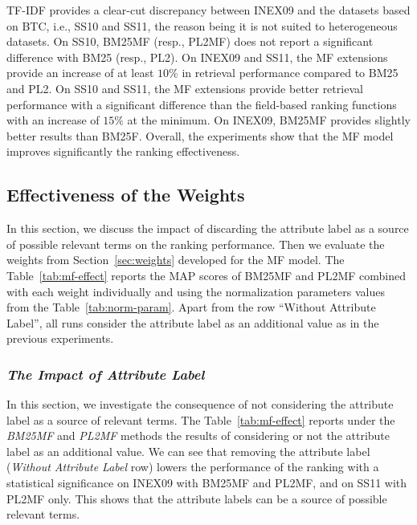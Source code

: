 TF-IDF provides a clear-cut discrepancy between INEX09 and the datasets based on BTC, i.e., SS10 and SS11, the reason being it is not suited to heterogeneous datasets.
On SS10, BM25MF (resp., PL2MF) does not report a significant difference with BM25 (resp., PL2). On INEX09 and SS11, the MF extensions provide an increase of at least $10\%$ in retrieval performance compared to BM25 and PL2. On SS10 and SS11, the MF extensions provide better retrieval performance with a significant difference than the field-based ranking functions with an increase of $15\%$ at the minimum. On INEX09, BM25MF provides slightly better results than BM25F. Overall, the experiments show that the MF model improves significantly the ranking effectiveness.



\subsection{Effectiveness of the Weights}
\label{sec:weights-effectiveness}

In this section, we discuss the impact of discarding the attribute label as a source of possible relevant terms on the ranking performance. Then we evaluate the weights from Section~\ref{sec:weights} developed for the MF model.
The Table~\ref{tab:mf-effect} reports the MAP scores of BM25MF and PL2MF combined with each weight individually and using the normalization parameters values from the Table~\ref{tab:norm-param}. Apart from the row ``Without Attribute Label'', all runs consider the attribute label as an additional value as in the previous experiments.

\subsubsection{\emph{The Impact of Attribute Label}}
\label{sec:with-att}

In this section, we investigate the consequence of not considering the attribute label as a source of relevant terms.
The Table~\ref{tab:mf-effect} reports under the \emph{BM25MF} and \emph{PL2MF} methods the results of considering or not the attribute label as an additional value.
We can see that removing the attribute label (\emph{Without Attribute Label} row) lowers the performance of the ranking with a statistical significance on INEX09 with BM25MF and PL2MF, and on SS11 with PL2MF only. This shows that the attribute labels can be a source of possible relevant terms.

